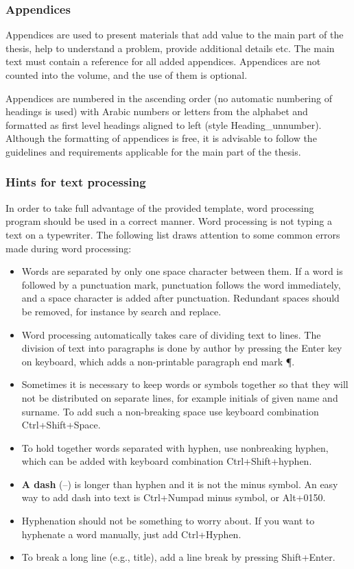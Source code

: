\subsubsection{Appendices}
Appendices are used to present materials that add value to the main part of the thesis, help to understand a problem, provide additional details etc. The main text must contain a
reference for all added appendices. Appendices are not counted into the volume, and the use of them is optional.

Appendices are numbered in the ascending order (no automatic numbering of headings is used) with Arabic numbers or letters from the alphabet and formatted as first level
headings aligned to left (style Heading\_unnumber). Although the formatting of appendices is free, it is advisable to follow the guidelines and requirements applicable for
the main part of the thesis.

\subsubsection{Hints for text processing}

In order to take full advantage of the provided template, word processing program should be used in a correct manner. Word processing is not typing a text on a typewriter. The following list draws attention to some common errors made during word processing:

\begin{itemize}
\item Words are separated by only one space character between them. If a word is followed by a punctuation mark, punctuation follows the word immediately, and a space character is added after punctuation. Redundant spaces should be removed, for instance by search and replace.

\item Word processing automatically takes care of dividing text to lines. The division of text into paragraphs is done by author by pressing the Enter key on keyboard,
which adds a non-printable paragraph end mark ¶.

\item Sometimes it is necessary to keep words or symbols together so that they will not
be distributed on separate lines, for example initials of given name and surname. To add such a non-breaking space use keyboard combination Ctrl+Shift+Space.

\item To hold together words separated with hyphen, use nonbreaking hyphen, which can be added with keyboard combination Ctrl+Shift+hyphen.

\item \textbf{A dash} (--) is longer than hyphen and it is not the minus symbol. An easy way to
add dash into text is Ctrl+Numpad minus symbol, or Alt+0150.

\item Hyphenation should not be something to worry about. If you want to hyphenate a
word manually, just add Ctrl+Hyphen.

\item To break a long line (e.g., title), add a line break by pressing Shift+Enter.
\end{itemize}